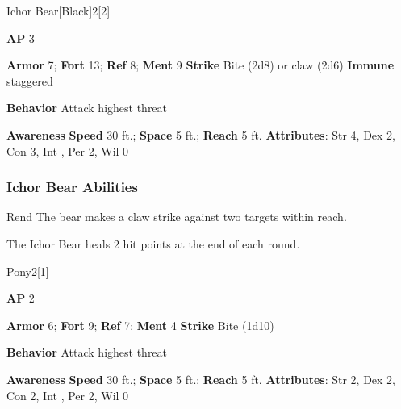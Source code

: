 \begin{monsection}{Ichor Bear}[Black]{2}[2]
\vspace{-1em}\vspace{-1em}
\begin{spellcontent}
\begin{spelltargetinginfo}
{\textbf{AP} 3}

\pari \textbf{Armor} 7;
\textbf{Fort} 13;
\textbf{Ref} 8;
\textbf{Ment} 9
\pari \textbf{Strike} Bite  (2d8) or claw  (2d6)
\pari \textbf{Immune} staggered


\pari \textbf{Behavior} Attack highest threat
\end{spelltargetinginfo}
\end{spellcontent}

\begin{monsterfooter}
\pari \textbf{Awareness} 
\pari \textbf{Speed} 30 ft.;
\textbf{Space} 5 ft.;
\textbf{Reach} 5 ft.
\pari \textbf{Attributes}:
Str 4,
Dex 2,
Con 3,
Int ,
Per 2,
Wil 0
\end{monsterfooter}
\end{monsection}


\subsubsection{Ichor Bear Abilities}

\begin{ability}{Rend}
The bear makes a claw strike against two targets within reach.
\end{ability}

The Ichor Bear heals 2 hit points at the end of each round.

\begin{monsection}{Pony}{2}[1]
\vspace{-1em}\vspace{-1em}
\begin{spellcontent}
\begin{spelltargetinginfo}
{\textbf{AP} 2}

\pari \textbf{Armor} 6;
\textbf{Fort} 9;
\textbf{Ref} 7;
\textbf{Ment} 4
\pari \textbf{Strike} Bite  (1d10)



\pari \textbf{Behavior} Attack highest threat
\end{spelltargetinginfo}
\end{spellcontent}

\begin{monsterfooter}
\pari \textbf{Awareness} 
\pari \textbf{Speed} 30 ft.;
\textbf{Space} 5 ft.;
\textbf{Reach} 5 ft.
\pari \textbf{Attributes}:
Str 2,
Dex 2,
Con 2,
Int ,
Per 2,
Wil 0
\end{monsterfooter}
\end{monsection}

